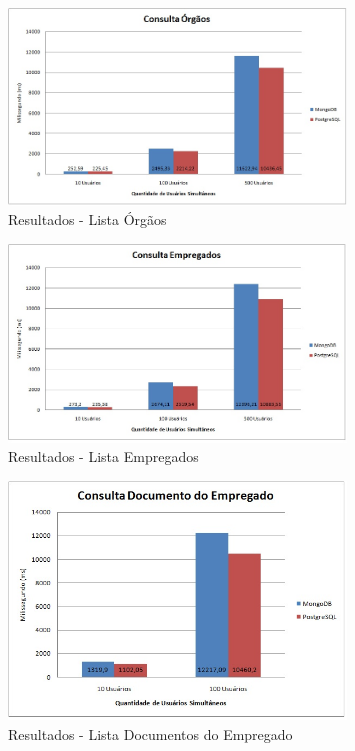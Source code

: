 \begin{figure}[!htbp]
	\begin{center}
		\includegraphics[width=0.8\textwidth]{resultados/consulta_orgaos}
	\end{center}
	\caption{Resultados - Lista Órgãos}
	\label{fig:resultlistaorgaos}
\end{figure}

\begin{figure}[!htbp]
	\begin{center}
		\includegraphics[width=0.8\textwidth]{resultados/consulta_empregados}
	\end{center}
	\caption{Resultados - Lista Empregados}
	\label{fig:resultlistaempregados}
\end{figure}

\begin{figure}[!htbp]
	\begin{center}
		\includegraphics[width=0.8\textwidth]{resultados/consulta_doc_empregado}
	\end{center}
	\caption{Resultados - Lista Documentos do Empregado}
	\label{fig:resultlistadocempregado}
\end{figure}

